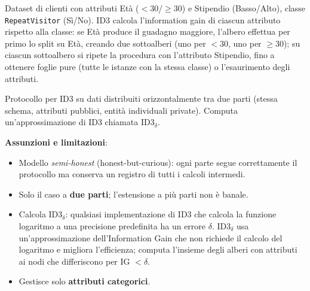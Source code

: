 \documentclass[a4paper,11pt]{article}
\begin{document}
\begin{esempio}
Dataset di clienti con attributi Et\`{a} ($<30$/$\geq 30$) e Stipendio (Basso/Alto), classe \texttt{RepeatVisitor} (S\`{i}/No). ID3 calcola l'information gain di ciascun attributo rispetto alla classe: se Et\`{a} produce il guadagno maggiore, l'albero effettua per primo lo split su Et\`{a}, creando due sottoalberi (uno per $<30$, uno per $\geq 30$); su ciascun sottoalbero si ripete la procedura con l'attributo Stipendio, fino a ottenere foglie pure (tutte le istanze con la stessa classe) o l'esaurimento degli attributi.
\end{esempio}

\begin{definizione}
Protocollo per ID3 su dati distribuiti orizzontalmente tra due parti (stessa schema, attributi pubblici, entit\`{a} individuali private). Computa un'approssimazione di ID3 chiamata ID3$_\delta$.

\textbf{Assunzioni e limitazioni}:
\begin{itemize}
  \item Modello \emph{semi-honest} (honest-but-curious): ogni parte segue correttamente il protocollo ma conserva un registro di tutti i calcoli intermedi.
  \item Solo il caso a \textbf{due parti}; l'estensione a pi\`{u} parti non \`{e} banale.
  \item Calcola ID3$_\delta$: qualsiasi implementazione di ID3 che calcola la funzione logaritmo a una precisione predefinita ha un errore $\delta$. ID3$_\delta$ usa un'approssimazione dell'Information Gain che non richiede il calcolo del logaritmo e migliora l'efficienza; computa l'insieme degli alberi con attributi ai nodi che differiscono per IG $< \delta$.
  \item Gestisce solo \textbf{attributi categorici}.
\end{itemize}


\end{definizione}
\end{document}
